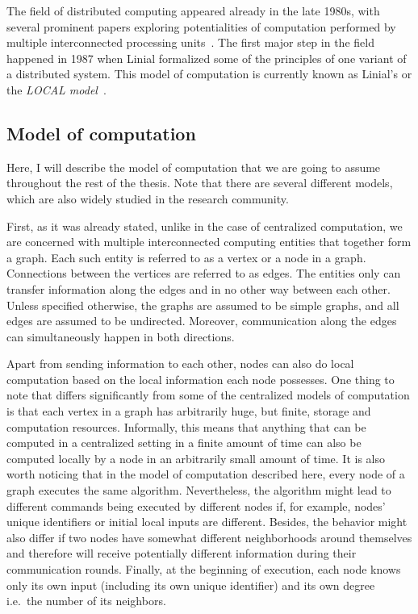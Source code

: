 The field of distributed computing appeared already in the late 1980s, with several
prominent papers exploring potentialities of computation performed
by multiple interconnected processing units~\cite{Cole1986, Linial1987, Naor1991}.
The first major step in the field happened in 1987 when Linial formalized
some of the principles of one variant of a distributed system.
This model of computation is currently known as Linial's or the \emph{LOCAL model}~\cite{Linial1987}.

\subsection{Model of computation}

Here, I will describe the model of computation that we are going to
assume throughout the rest of the thesis.
Note that there are several
different models, which are also widely studied
in the research community.

First, as it was already stated, unlike in the case of centralized
computation, we are concerned with multiple interconnected computing entities
that together form a graph. Each such entity is referred to as a vertex or
a node in a graph. Connections between the vertices are referred to as edges.
The entities only can transfer information along the edges and in no other way
between each other. Unless specified otherwise, the graphs are assumed to be
simple graphs, and all edges are assumed to be undirected. Moreover,
communication along the edges can simultaneously happen in both directions.

Apart from sending information to each other, nodes can also
do local computation based on the local information each node possesses. One thing
to note that differs significantly from some of the centralized models of computation
is that each vertex in a graph has arbitrarily huge, but finite, storage and computation resources.
Informally, this means that anything that can be computed in a centralized setting
in a finite amount of time
can also be computed locally by a node in an arbitrarily small amount of time.
It is also worth noticing that in the model of computation described here,
every node of a graph executes the same algorithm. Nevertheless, the
algorithm might lead to different commands being executed by different nodes
if, for example, nodes' unique identifiers or initial local inputs are different.
Besides, the behavior might also differ if two nodes have somewhat different neighborhoods
around themselves and therefore will receive potentially different
information during their communication rounds. Finally, at the beginning of
execution, each node knows only its own input (including its own unique identifier) and its own degree i.e.\ the number of
its neighbors.

